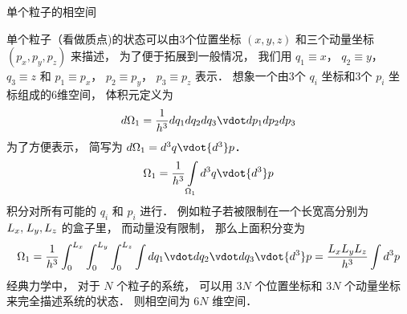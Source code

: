 
单个粒子的相空间

单个粒子（看做质点)的状态可以由3个位置坐标 $\left( {x,y,z} \right)$ 和三个动量坐标 $\left( {{p_x},{p_y},{p_z}} \right)$ 来描述， 为了便于拓展到一般情况， 我们用 ${q_1} \equiv x$，   ${q_2} \equiv y$， ${q_3} \equiv z$   和 ${p_1} \equiv {p_x}$，   ${p_2} \equiv {p_y}$， ${p_3} \equiv {p_z}$   表示． 想象一个由3个 ${q_i}$  坐标和3个 ${p_i}$  坐标组成的6维空间， 体积元定义为
 \begin{equation}
d{\Omega _1} = \frac{1}{{{h^3}}}d{q_1}d{q_2}d{q_3} \vdot d{p_1}d{p_2}d{p_3}
\end{equation} 
为了方便表示， 简写为  $d{\Omega _1} = {d^3}q \vdot {d^3}p$． 
  \begin{equation}
{\Omega _1} = \frac{1}{{{h^3}}}\int\limits_{{\Omega _1}} {{d^3}q \vdot {d^3}p} 
\end{equation} 
积分对所有可能的 ${q_i}$ 和 ${p_i}$ 进行． 例如粒子若被限制在一个长宽高分别为 ${L_x},{\kern 1pt} {L_y},{L_z}$ 的盒子里， 而动量没有限制， 那么上面积分变为
  \begin{equation}
{\Omega _1} = \frac{1}{{{h^3}}}\int_0^{{L_x}} {\int_0^{{L_y}} {\int_0^{{L_z}} {\int {d{q_1} \vdot d{q_2} \vdot d{q_3}} } }  \vdot {d^3}p}  = \frac{{{L_x}{L_y}{L_z}}}{{{h^3}}}\int {{d^3}p} 
\end{equation} 
经典力学中， 对于 $N$ 个粒子的系统， 可以用 $3N$ 个位置坐标和 $3N$ 个动量坐标来完全描述系统的状态． 则相空间为 $6N$ 维空间．
